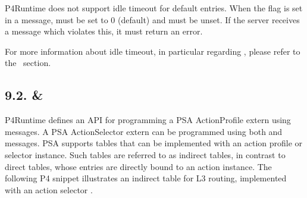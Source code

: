 \documentclass[11pt]{article}
\begin{document}
{%
P4Runtime does not support idle timeout for default entries. When the
 flag is set in a  message, 
must be set to 0 (default) and  must be unset. If the
server receives a  message which violates this, it must return an
 error.%

For more information about idle timeout, in particular regarding
, please refer to the~ section.%

\subsection{9.2.\hspace*{0.5em} \& }\label{sec-action-profile-member-and-group}%

\noindent{}P4Runtime defines an API for programming a PSA ActionProfile extern using
 messages. A PSA ActionSelector extern can be programmed
using both  and  messages. PSA supports
tables that can be implemented with an action profile or selector instance. Such
tables are referred to as indirect tables, in contrast to direct tables, whose
entries are directly bound to an action instance. The following P4 snippet
illustrates an indirect table  for L3 routing, implemented with an action
selector .%

}
\end{document}
